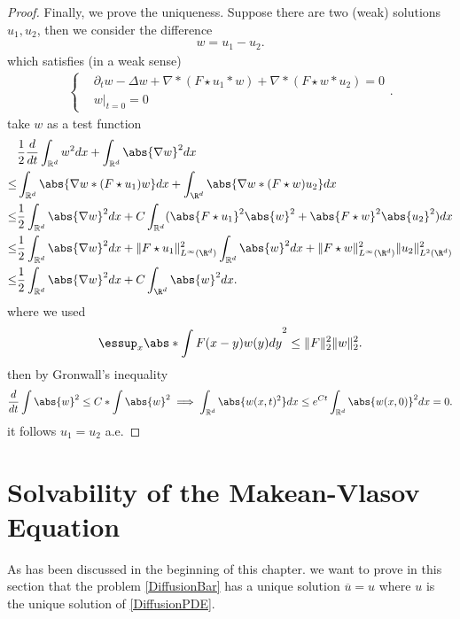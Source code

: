 \begin{proof}
   \vskip5mm
   Finally, we prove the uniqueness. Suppose there are two (weak) solutions $u_{1},u_{2}$, then we consider the difference 
 \begin{align*}
  w = u_{1} - u_{2}
 .\end{align*}
 which satisfies  (in a weak sense)
 \begin{align*}
  \begin{cases}
    &\partial_t w - \Delta w + \nabla *(F \star  u_{1} * w) + \nabla*(F \star w * u_{2}) = 0\\
    &w \rvert_{t=0} = 0
  \end{cases}
 .\end{align*}
take $w$ as a test function 
\begin{align*}
&  \frac{1}{2} \frac{d}{dt} \int_{\mathbb{R}^{d} } w^2dx+ \int_{\mathbb{R}^{d} } \abs{\nabla w}^2dx \\
 \le & \int_{\mathbb{R}^{d} } \abs{\nabla w *(F \star  u_{1})w} dx  + \int_{\R^d}  \abs{\nabla w * (F \star  w)u_{2}} dx\\
 \le & \frac{1}{2} \int_{\mathbb{R}^{d} } \abs{\nabla w}^2dx + C\int_{\mathbb{R}^{d} } (\abs{F \star  u_{1}}^2 \abs{w}^2 + \abs{F \star  w}^2 \abs{u_{2}}^2)dx\\
   \le & \frac{1}{2} \int_{\mathbb{R}^{d} } \abs{\nabla w}^2dx+ \|F\star  u_{1}\|_{L^{\infty}(\R^d)}^2 \int_{\mathbb{R}^{d} }  \abs{w}^2dx + \|F \star  w\|_{L^\infty(\R^d)}^2 \|u_2\|_{L^{2}(\R^d) }^2\\
        \le & \frac{1}{2} \int_{\mathbb{R}^{d} } \abs{\nabla w}^2dx+ C \int_{\R^d}\abs{w}^2 dx%
.\end{align*}
where we used
\begin{align*}
  \essup_{x} \abs*{\int  F(x-y)w(y) dy}^2 \le \|F\|_2^{2}\|w\|_2^{2}  
.\end{align*}
then by Gronwall's inequality
\begin{align*}
  \frac{d}{dt} \int \abs{w}^2 \le C*\int \abs{w}^2 \implies \int_{\mathbb{R}^{d} }\abs{w(x,t)^2}dx \le  e^{Ct} \int_{\mathbb{R}^{d} } \abs{w(x,0)}^2 dx = 0
.\end{align*}
it follows $u_{1}=u_{2}$ a.e.
\end{proof}

\section{Solvability of the Makean-Vlasov Equation}
As has been discussed in the beginning of this chapter. we want to prove in this section that the problem \autoref{DiffusionBar} has a unique solution $\overline{u}=u$ where $u$ is the unique solution of \autoref{DiffusionPDE}.

